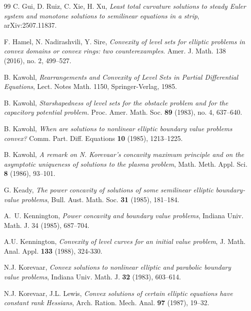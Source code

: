 \documentclass[reqno,12pt]{amsart}
\numberwithin{equation}{section}
\theoremstyle{remark}
\begin{document}
\begin{thebibliography}{99}
C. Gui, D. Ruiz, C. Xie, H. Xu, \emph{Least total curvature solutions to steady Euler system and monotone solutions to semilinear equations in a strip}, 	arXiv:2507.11837.



F. Hamel, N. Nadirashvili, Y. Sire, 
\emph{Convexity of level sets for elliptic problems in convex domains or convex rings: two counterexamples}.  
Amer. J. Math.  138  (2016), no. 2, 499--527.

B. Kawohl, \emph{Rearrangements and Convexity of Level Sets in Partial Differential Equations}, Lect. Notes Math.
1150, Springer-Verlag, 1985.

B. Kawohl, \emph{Starshapedness of level sets for the obstacle problem and for the capacitory potential problem. }
Proc. Amer. Math. Soc. \textbf{89} (1983), no. 4, 637--640.

 B. Kawohl, \emph{When are solutions to nonlinear elliptic boundary value problems convex?}  Comm. Part. Diff. Equations \textbf{10} (1985), 1213--1225.

B. Kawohl, \emph{A remark on N. Korevaar's concavity maximum principle and on the asymptotic uniqueness of solutions to the plasma problem}, Math. Meth. Appl. Sci. \textbf{8} (1986), 93--101.



G. Keady, \emph{The power concavity of solutions of some semilinear elliptic boundary-value problems}, Bull. Aust.
Math. Soc. \textbf{31} (1985), 181--184.



A.~U. Kennington,
\emph{ Power concavity and boundary value problems},
Indiana Univ. Math. J. 34 (1985), 687--704.

 A.U. Kennington, \emph{Convexity of level curves for an initial value problem}, J. Math. Anal. Appl. \textbf{133} (1988), 324-330.

 
 N.J. Korevaar, \emph{Convex solutions to nonlinear elliptic and parabolic boundary value problems}, Indiana Univ. Math. J. \textbf{32} (1983), 603--614.

  

N.J. Korevaar, J.L. Lewis, \emph{Convex solutions of certain elliptic equations have constant rank Hessians}, Arch. Ration. Mech. Anal. \textbf{97} (1987), 19--32.


\end{thebibliography}
\end{document}
